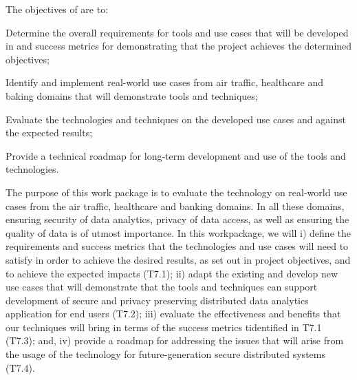 \addtocounter{wpno}{1}
\begin{Workpackage}{\thewpno}
\WPTitle{\wpname{\thewpno}}


\begin{WPObjectives}
The objectives of \theWP{} are to:
\begin{compactitem}
\item	Determine the overall requirements for tools and use cases that will be developed in \TheProject{} and success metrics for demonstrating that the project achieves the determined objectives;
\item	Identify and implement real-world use cases from air traffic, healthcare and baking domains that will demonstrate \TheProject{} tools and techniques;
\item	Evaluate the \TheProject{} technologies and techniques on the developed use cases and against the expected results;
\item	Provide a technical roadmap for long-term development and use of the \TheProject tools and technologies.
\end{compactitem}
\end{WPObjectives}

\begin{WPDescription}
The purpose of this work package is to evaluate the \TheProject technology on real-world use cases from the air traffic, healthcare and banking domains. In all these domains, ensuring security of data analytics, privacy of data access, as well as ensuring the quality of data is of utmost importance. In this workpackage, we will i) define the requirements and success metrics that the \TheProject{} technologies and use cases will need to satisfy in order to achieve the desired results, as set out in project objectives, and to achieve the expected impacts (T7.1); ii) adapt the existing and develop new use cases that will demonstrate that the \TheProject{} tools and techniques can support development of secure and privacy preserving distributed data analytics application for end users (T7.2); iii)  evaluate the effectiveness and benefits that our techniques will bring in terms of the success metrics tidentified in T7.1 (T7.3); and, iv) provide a roadmap for addressing the issues that will arise from the usage of the \TheProject{} technology for future-generation
secure distributed systems (T7.4).
\end{WPDescription}

\begin{Task}


\end{Task}
\end{Workpackage}
